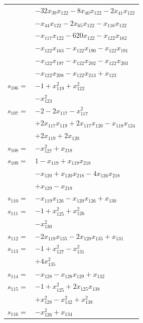 \begin{longtable}{@{}r@{\;}l@{}}
 & \(\displaystyle -32x_{39}x_{122} -8x_{40}x_{122} -2x_{41}x_{122}\) \\
 & \(\displaystyle -x_{44}x_{122} -2x_{65}x_{122} -x_{116}x_{122}\) \\
 & \(\displaystyle -x_{117}x_{122} -620x_{122} -x_{122}x_{162}\) \\
 & \(\displaystyle -x_{122}x_{163} -x_{122}x_{190} -x_{122}x_{191}\) \\
 & \(\displaystyle -x_{122}x_{197} -x_{122}x_{202} -x_{122}x_{203}\) \\
 & \(\displaystyle -x_{122}x_{208} -x_{122}x_{213} +x_{123}\) \\[3pt]
\(s_{106}=\) & \(\displaystyle -1 +x_{119}^{2} +x_{122}^{2}\) \\
 & \(\displaystyle -x_{123}^{2}\) \\[3pt]
\(s_{107}=\) & \(\displaystyle -2 -2x_{117} -x_{117}^{2}\) \\
 & \(\displaystyle +2x_{117}x_{119} +2x_{117}x_{120} -x_{118}x_{124}\) \\
 & \(\displaystyle +2x_{119} +2x_{120}\) \\[3pt]
\(s_{108}=\) & \(\displaystyle -x_{127}^{2} +x_{218}\) \\[3pt]
\(s_{109}=\) & \(\displaystyle 1 -x_{119} +x_{119}x_{218}\) \\
 & \(\displaystyle -x_{120} +x_{120}x_{218} -4x_{126}x_{218}\) \\
 & \(\displaystyle +x_{129} -x_{218}\) \\[3pt]
\(s_{110}=\) & \(\displaystyle -x_{119}x_{126} -x_{120}x_{126} +x_{130}\) \\[3pt]
\(s_{111}=\) & \(\displaystyle -1 +x_{125}^{2} +x_{126}^{2}\) \\
 & \(\displaystyle -x_{130}^{2}\) \\[3pt]
\(s_{112}=\) & \(\displaystyle -2x_{119}x_{135} -2x_{120}x_{135} +x_{131}\) \\[3pt]
\(s_{113}=\) & \(\displaystyle -1 +x_{127}^{2} -x_{131}^{2}\) \\
 & \(\displaystyle +4x_{135}^{2}\) \\[3pt]
\(s_{114}=\) & \(\displaystyle -x_{128} -x_{128}x_{129} +x_{132}\) \\[3pt]
\(s_{115}=\) & \(\displaystyle -1 +x_{125}^{2} +2x_{125}x_{138}\) \\
 & \(\displaystyle +x_{128}^{2} -x_{132}^{2} +x_{138}^{2}\) \\[3pt]
\(s_{116}=\) & \(\displaystyle -x_{126}^{2} +x_{134}\) \\[3pt]

\end{longtable}
